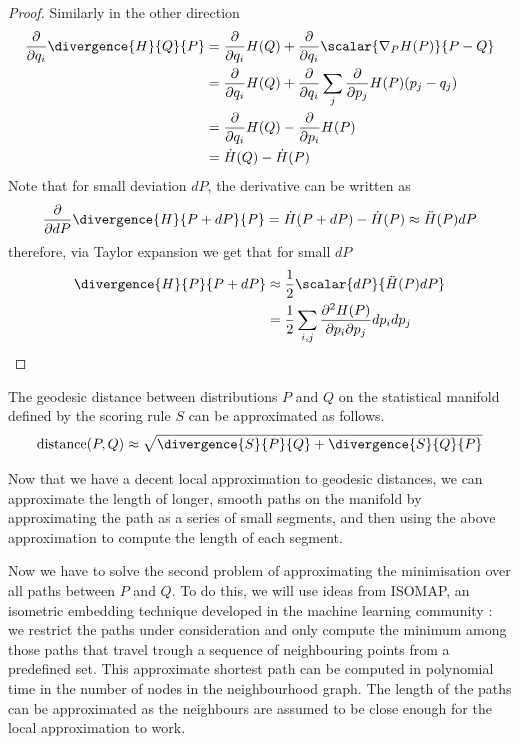 \begin{statement}
\begin{proof}
	Similarly in the other direction
		\begin{align}
				\frac{\partial}{\partial q_i} \divergence{H}{Q}{P} &=  \frac{\partial}{\partial q_i} H(Q) + 	\frac{\partial}{\partial q_i}\scalar{\nabla_{P} H(P)}{P - Q}\\
					&=  \frac{\partial}{\partial q_i} H(Q) + \frac{\partial}{\partial q_i}\sum_{j} \frac{\partial}{\partial p_j} H(P) (p_j - q_j)\\
					&=  \frac{\partial}{\partial q_i} H(Q)  - \frac{\partial}{\partial p_i} H(P)\\
					&= \dot{H}(Q) - \dot{H}(P)
		\end{align}
		Note that for small deviation $dP$, the derivative can be written as
		\begin{align}
			\frac{\partial}{\partial dP} \divergence{H}{P+dP}{P} = \dot{H}(P+dP) - \dot{H}(P) \approx  \ddot{H}(P) dP
		\end{align}
		therefore, via Taylor expansion we get that for small $dP$
		\begin{align}
			\divergence{H}{P}{P+dP} &\approx \frac{1}{2} \scalar{dP}{\ddot{H}(P)dP}\\
				&= \frac{1}{2} \sum_{i,j} \frac{\partial^2 H(P)}{\partial p_i\partial p_j} dp_{i} dp_j
		\end{align}
\end{proof}
\end{statement}

\begin{corollary}
	The geodesic distance between distributions $P$ and $Q$ on the statistical manifold defined by the scoring rule $S$ can be approximated as follows.
	\begin{equation}
		\mbox{distance}(P,Q) \approx \sqrt{\divergence{S}{P}{Q} + \divergence{S}{Q}{P}} \label{eqn:local_approximation}
	\end{equation}
\end{corollary}

Now that we have a decent local approximation to geodesic distances, we can approximate the length of longer, smooth paths on the manifold by approximating the path as a series of small segments, and then using the above approximation to compute the length of each segment.

Now we have to solve the second problem of approximating the minimisation over all paths between $P$ and $Q$. To do this, we will use ideas from ISOMAP, an isometric embedding technique developed in the machine learning community \cite{Isomap}: we restrict the paths under consideration and only compute the minimum among those paths that travel trough a sequence of neighbouring points from a predefined set. This approximate shortest path can be computed in polynomial time in the number of nodes in the neighbourhood graph. The length of the paths can be approximated as the neighbours are assumed to be close enough for the local approximation to work.

